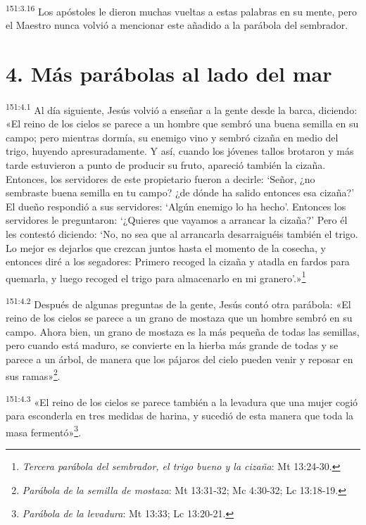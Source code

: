 \par 
\textsuperscript{151:3.16} Los apóstoles le dieron muchas vueltas a estas palabras en su mente, pero el Maestro nunca volvió a mencionar este añadido a la parábola del sembrador.

\section*{4. Más parábolas al lado del mar}
\par 
\textsuperscript{151:4.1} Al día siguiente, Jesús volvió a enseñar a la gente desde la barca, diciendo: «El reino de los cielos se parece a un hombre que sembró una buena semilla en su campo; pero mientras dormía, su enemigo vino y sembró cizaña en medio del trigo, huyendo apresuradamente. Y así, cuando los jóvenes tallos brotaron y más tarde estuvieron a punto de producir su fruto, apareció también la cizaña. Entonces, los servidores de este propietario fueron a decirle: `Señor, ¿no sembraste buena semilla en tu campo? ¿de dónde ha salido entonces esa cizaña?' El dueño respondió a sus servidores: `Algún enemigo lo ha hecho'. Entonces los servidores le preguntaron: `¿Quieres que vayamos a arrancar la cizaña?' Pero él les contestó diciendo: `No, no sea que al arrancarla desarraiguéis también el trigo. Lo mejor es dejarlos que crezcan juntos hasta el momento de la cosecha, y entonces diré a los segadores: Primero recoged la cizaña y atadla en fardos para quemarla, y luego recoged el trigo para almacenarlo en mi granero'.»\footnote{\textit{Tercera parábola del sembrador, el trigo bueno y la cizaña}: Mt 13:24-30.}

\par 
\textsuperscript{151:4.2} Después de algunas preguntas de la gente, Jesús contó otra parábola: «El reino de los cielos se parece a un grano de mostaza que un hombre sembró en su campo. Ahora bien, un grano de mostaza es la más pequeña de todas las semillas, pero cuando está maduro, se convierte en la hierba más grande de todas y se parece a un árbol, de manera que los pájaros del cielo pueden venir y reposar en sus ramas»\footnote{\textit{Parábola de la semilla de mostaza}: Mt 13:31-32; Mc 4:30-32; Lc 13:18-19.}.

\par 
\textsuperscript{151:4.3} «El reino de los cielos se parece también a la levadura que una mujer cogió para esconderla en tres medidas de harina, y sucedió de esta manera que toda la masa fermentó»\footnote{\textit{Parábola de la levadura}: Mt 13:33; Lc 13:20-21.}.

